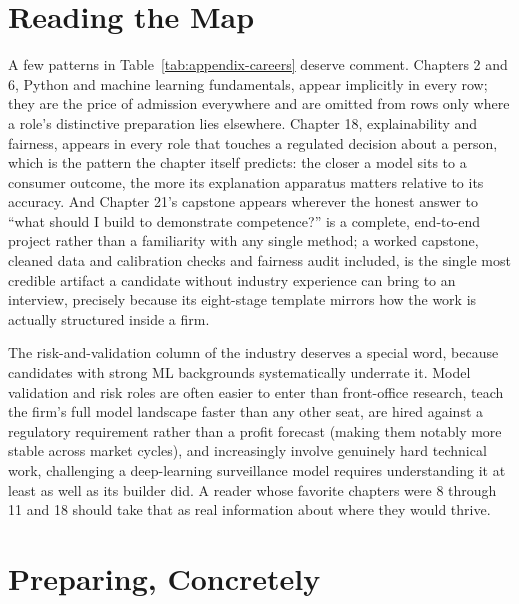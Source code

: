 \documentclass[../ai_in_finance]{subfiles}
\begin{document}
\section{Reading the Map}

A few patterns in Table~\ref{tab:appendix-careers} deserve comment. Chapters 2 and 6, Python and machine learning fundamentals, appear implicitly in every row; they are the price of admission everywhere and are omitted from rows only where a role's distinctive preparation lies elsewhere. Chapter 18, explainability and fairness, appears in every role that touches a regulated decision about a person, which is the pattern the chapter itself predicts: the closer a model sits to a consumer outcome, the more its explanation apparatus matters relative to its accuracy. And Chapter 21's capstone appears wherever the honest answer to ``what should I build to demonstrate competence?'' is a complete, end-to-end project rather than a familiarity with any single method; a worked capstone, cleaned data and calibration checks and fairness audit included, is the single most credible artifact a candidate without industry experience can bring to an interview, precisely because its eight-stage template mirrors how the work is actually structured inside a firm.

The risk-and-validation column of the industry deserves a special word, because candidates with strong ML backgrounds systematically underrate it. Model validation and risk roles are often easier to enter than front-office research, teach the firm's full model landscape faster than any other seat, are hired against a regulatory requirement rather than a profit forecast (making them notably more stable across market cycles), and increasingly involve genuinely hard technical work, challenging a deep-learning surveillance model requires understanding it at least as well as its builder did. A reader whose favorite chapters were 8 through 11 and 18 should take that as real information about where they would thrive.

\section{Preparing, Concretely}
\end{document}
